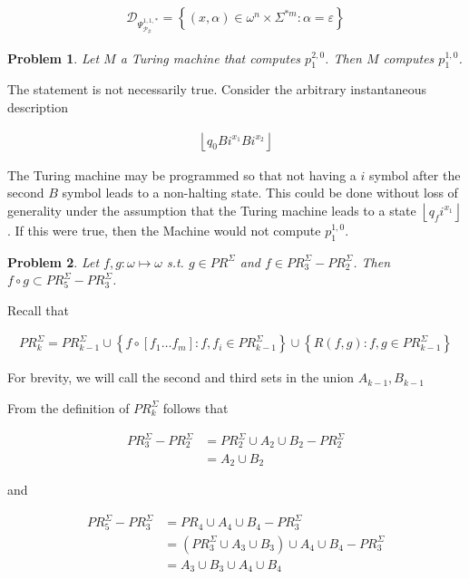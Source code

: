 \documentclass[a4paper, 12pt]{article}
\newtheorem{problem}{Problem}
\newtheorem{problem}{Problem}
\begin{document}
\begin{align*}
    \mathcal{D}_{\Psi_{\mathcal{P}_\#}^{1, 1, *}} = \left\{ (x, \alpha) \in
    \omega^{n} \times \Sigma^{*m}  : \alpha = \varepsilon  \right\} 
\end{align*}


\begin{problem}
    Let $M$ a Turing machine that computes $p_1^{2, 0}$. Then $M$ computes
    $p_1^{1, 0}$.
\end{problem}

The statement is not necessarily true. Consider the arbitrary instantaneous
description 

\begin{align*}
    \left\lfloor q_0 B i^{x_1} B i^{x_2} \right\rfloor
\end{align*}

The Turing machine may be programmed so that not having a $i$ symbol after the
second $B$ symbol leads to a non-halting state. This could be done without loss
of generality under the assumption that the Turing machine leads to a state
$\left\lfloor q_f i^{x_1} \right\rfloor$. If this were true, then the Machine
would not compute $p_1^{1, 0}$.

\pagebreak
\begin{problem}
    Let $f, g : \omega \mapsto \omega$ s.t. $g \in PR^{\Sigma}$ and $f \in
    PR_3^{\Sigma} - PR_2^{\Sigma}$. Then $f \circ g \subset PR_5^{\Sigma} -
    PR_3^{\Sigma}$.
\end{problem}

Recall that 

\begin{align*}
    PR_{k}^{\Sigma} = PR_{k-1}^{\Sigma} \cup \left\{ f \circ [f_1\ldots f_m] :
    f, f_i \in PR_{k-1}^{\Sigma} \right\}  \cup \left\{ R(f, g) : f, g \in
PR_{k-1}^{\Sigma} \right\} 
\end{align*}

For brevity, we will call the second and third sets in the union $A_{k-1},
B_{k-1}$

From the definition of $PR_k^{\Sigma}$ follows that

\begin{align*}
    PR_3^{\Sigma} - PR_2^{\Sigma} &= PR_{2}^{\Sigma} \cup A_2 \cup B_2
     - PR_2^{\Sigma}\\ 
                                  &= A_2 \cup B_2
\end{align*}

and 

\begin{align*}
    PR_5^{\Sigma} - PR_3^{\Sigma} &= PR_4 \cup A_4 \cup B_4 - PR_3^{\Sigma} \\ 
                                  &= (PR_3^{\Sigma} \cup A_3 \cup B_3) \cup A_4
                                  \cup B_4 - PR_3^{\Sigma} \\ 
                                  &=A_3 \cup B_3 \cup A_4 \cup B_4
\end{align*}
\end{document}
